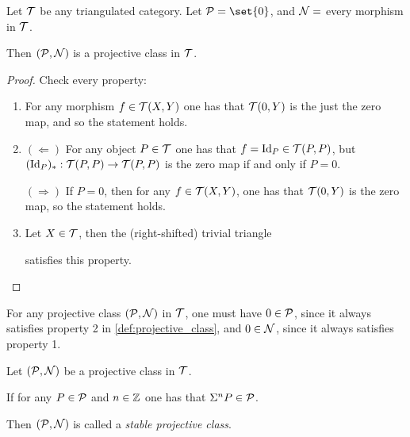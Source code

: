 \begin{example}
    Let \( {\mathcal{T}} \) be any triangulated category. Let \( \Pc = \set{0} \), and \( {\mathcal{N}} = \) every morphism in \( {\mathcal{T}} \).

    Then \( ({\mathcal{P}}, {\mathcal{N}}) \) is a projective class in \( {\mathcal{T}} \).
\end{example}
\begin{proof}
    Check every property:
    \begin{enumerate}
        \item {
            For any morphism \( f \in {\mathcal{T}}(X, Y) \) one has that \( {\mathcal{T}}(0, Y) \) is the just the zero map, and so the statement holds.
        }
        \item {
            \( (\Leftarrow) \) For any object \( P \in {\mathcal{T}} \) one has that \( f = \operatorname{Id}_P \in {\mathcal{T}}(P, P) \), but \( (\operatorname{Id}_P)_*: {\mathcal{T}}(P, P) \to {\mathcal{T}}(P, P) \) is the zero map if and only if \( P = 0 \).

            \( (\Rightarrow) \) If \( P = 0 \), then for any \( f \in {\mathcal{T}}(X, Y) \), one has that \( {\mathcal{T}}(0, Y) \) is the zero map, so the statement holds. 
        }
        \item {
            Let \( X \in {\mathcal{T}} \), then the (right-shifted) trivial triangle
            \begin{center}
            \end{center}
            satisfies this property.
        }
    \end{enumerate}
\end{proof}

\begin{remark}
    For any projective class \( ( {\mathcal{P}}, {\mathcal{N}} ) \) in \( {\mathcal{T}} \), one must have \( 0 \in {\mathcal{P}} \), since it always satisfies property 2 in \autoref{def:projective_class}, and \( 0 \in {\mathcal{N}} \), since it always satisfies property 1.
\end{remark}

\begin{definition}
    Let \( ({\mathcal{P}}, {\mathcal{N}}) \) be a projective class in \( {\mathcal{T}} \).

    If for any \( P \in {\mathcal{P}} \) and \( n \in {\mathbb{Z}} \) one has that \( \Sigma^n P \in {\mathcal{P}} \).
    
    Then \( ({\mathcal{P}}, {\mathcal{N}}) \) is called a \emph{stable projective class}.
\end{definition}

